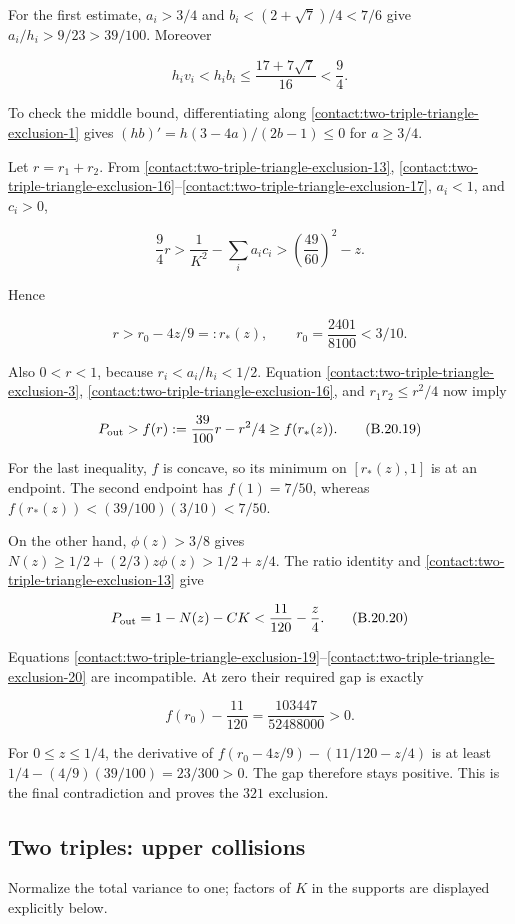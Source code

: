 For the first estimate, $a_i>3/4$ and
$b_i<(2+\sqrt{7})/4<7/6$ give $a_i/h_i>9/23>39/100$.
Moreover

\[
 h_iv_i<h_ib_i\leq\frac{17+7\sqrt7}{16}<\frac94.
\tag{B.20.17}\label{contact:two-triple-triangle-exclusion-17}
\]

To check the middle bound, differentiating along \eqref{contact:two-triple-triangle-exclusion-1} gives
$(h b)'=h(3-4a)/(2b-1)\le 0$ for $a\ge 3/4$.

Let $r=r_1+r_2$. From \eqref{contact:two-triple-triangle-exclusion-13}, \eqref{contact:two-triple-triangle-exclusion-16}--\eqref{contact:two-triple-triangle-exclusion-17}, $a_i<1$, and $c_i>0$,

\[
 \frac94r>
 \frac1{K^2}-\sum_i a_ic_i
 >\left(\frac{49}{60}\right)^2-z.
\]

Hence

\[
 r>r_0-4z/9=:r_*(z),\qquad r_0=\frac{2401}{8100}<3/10.
\tag{B.20.18}\label{contact:two-triple-triangle-exclusion-18}
\]

Also $0<r<1$, because $r_i<a_i/h_i<1/2$. Equation \eqref{contact:two-triple-triangle-exclusion-3}, \eqref{contact:two-triple-triangle-exclusion-16}, and
$r_1r_2\le r^2/4$ now imply

\[
 P_{\rm out}>f(r):=\frac{39}{100}r-r^2/4\geq f(r_*(z)).
\tag{B.20.19}\label{contact:two-triple-triangle-exclusion-19}
\]

For the last inequality, $f$ is concave, so its minimum on
$[r_*(z),1]$ is at an endpoint. The second endpoint has
$f(1)=7/50$, whereas $f(r_*(z))<(39/100)(3/10)<7/50$.

On the other hand, $\phi(z)>3/8$ gives
$N(z)\ge 1/2+(2/3)z \phi(z)>1/2+z/4$. The ratio identity and \eqref{contact:two-triple-triangle-exclusion-13} give

\[
 P_{\rm out}=1-N(z)-CK<\frac{11}{120}-\frac{z}{4}.
\tag{B.20.20}\label{contact:two-triple-triangle-exclusion-20}
\]

Equations \eqref{contact:two-triple-triangle-exclusion-19}--\eqref{contact:two-triple-triangle-exclusion-20} are incompatible. At zero their required gap is
exactly

\[
 f(r_0)-\frac{11}{120}=\frac{103447}{52488000}>0.
\]

For $0\le z\le 1/4$, the derivative of
$f(r_0-4z/9)-(11/120-z/4)$ is at least
$1/4-(4/9)(39/100)=23/300>0$. The gap therefore stays positive.
This is the final contradiction and proves the $321$ exclusion.
\subsection{Two triples: upper collisions}\label{contact:two-triple-collision-322-exclusion}
Normalize the total variance to one; factors of $K$ in the supports are displayed explicitly below.




